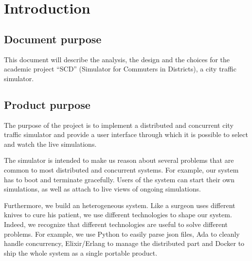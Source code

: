\section{Introduction}
\subsection{Document purpose}
This document will describe the analysis, the design and the choices for the
academic project ``SCD'' (Simulator for Commuters in Districts), a city traffic
simulator.

\subsection{Product purpose}\label{productPurpose}
The purpose of the project is to implement a distributed and concurrent city
traffic simulator and provide a user interface through which it is possible to
select and watch the live simulations.

The simulator is intended to make us reason about several problems that
are common to most distributed and concurrent systems. For
example, our system has to boot and terminate gracefully.
Users of the system can start their own simulations, as well as attach to live
views of ongoing simulations.

Furthermore, we build an heterogeneous system.
Like a surgeon uses different knives to cure his patient, we use different
technologies to shape our system.
Indeed, we recognize that different technologies are useful to solve
different problems. For example, we use Python to easily parse json files,
Ada to cleanly handle concurrency, Elixir/Erlang to manage
the distributed part and Docker to ship the whole system as a
single portable product.
